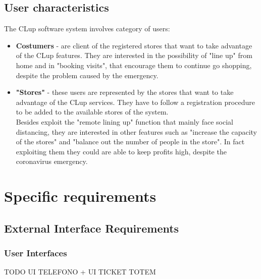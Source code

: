 \documentclass[]{article}
\begin{document}
\subsection{User characteristics}
The CLup software system involves category of users:
\begin{itemize}
	\renewcommand{\labelitemi}{$-$}
	\item \textbf{Costumers} - are client of the registered stores that want to take advantage of the CLup features. They are interested in the possibility of "line up" from home and in "booking visits", that encourage them to continue go shopping, despite the problem caused by the emergency.
	
	\item \textbf{"Stores"} - these users are represented by the stores that want to take advantage of the CLup services. They have to follow a registration procedure to be added to the available stores of the system. 
	\\Besides exploit the "remote lining up" function that mainly face social distancing, they are interested in other features such as "increase the capacity of the stores" and "balance out the number of people in the store". In fact exploiting them they could are able to keep profits high, despite the coronavirus emergency. 		
\end{itemize}


	
	\section{Specific requirements}
	
		\subsection{External Interface Requirements}
			\subsubsection{User Interfaces}
			TODO UI TELEFONO + UI TICKET TOTEM
\end{document}
